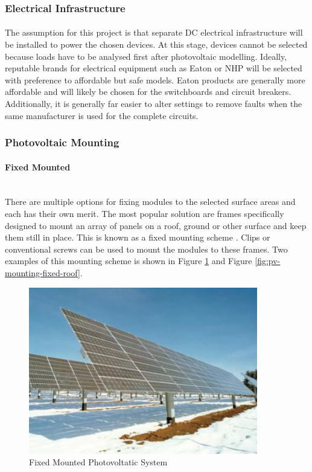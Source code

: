 \subsubsection{Electrical Infrastructure}

\paragraph{}
The assumption for this project is that separate DC electrical infrastructure will be installed to power the chosen devices. At this stage, devices cannot be selected because loads have to be analysed first after photovoltaic modelling. Ideally, reputable brands for electrical equipment such as Eaton or NHP will be selected with preference to affordable but safe models. Eaton products are generally more affordable and will likely be chosen for the switchboards and circuit breakers. Additionally, it is generally far easier to alter settings to remove faults when the same manufacturer is used for the complete circuits.  

\subsubsection{Photovoltaic Mounting}

\paragraph{Fixed Mounted} 
~\\
There are multiple options for fixing modules to the selected surface areas and each has their own merit. The most popular solution are frames specifically designed to mount an array of panels on a roof, ground or other surface and keep them still in place. This is known as a fixed mounting scheme \cite{Haberlin2012}. Clips or conventional screws can be used to mount the modules to these frames. Two examples of this mounting scheme is shown in Figure \ref{fig:pv-mounting-fixed-field} and Figure \ref{fig:pv-mounting-fixed-roof}. 

\begin{figure}[H]
	\hfill\includegraphics[width = 100mm]{images/pv-fixed-mounting}\hspace*{\fill}
	\caption{Fixed Mounted Photovoltatic System \cite{Haberlin2012}} 
	\label{fig:pv-mounting-fixed-field}
\end{figure}

